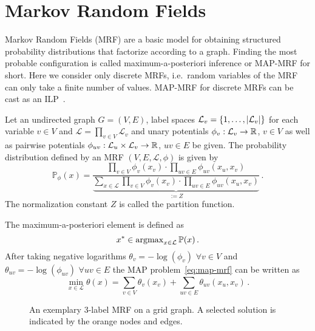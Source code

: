 \section{Markov Random Fields}
\label{sec:mrf}
Markov Random Fields (MRF) are a basic model for obtaining structured probability distributions that factorize according to a graph.
Finding the most probable configuration is called maximum-a-posteriori inference or MAP-MRF for short.
Here we consider only discrete MRFs, i.e.\ random variables of the MRF can only take a finite number of values.
MAP-MRF for discrete MRFs can be cast as an ILP~\cite{werner2007linear}.


\begin{definition}[MRF]
    \label{def:mrf}
Let an undirected graph $G=(V,E)$, label spaces $\mathcal{L}_v = \{1,\ldots, \lvert\mathcal{L}_v\rvert\}$ for each variable $v \in V$ and $\mathcal{L} = \prod_{v \in V} \mathcal{L}_v$ and 
unary potentials $\phi_v : \mathcal{L}_v \rightarrow \mathbb{R}$, $v \in V$ as well as pairwise potentials
$\phi_{uv} : \mathcal{L}_u \times \mathcal{L}_v \rightarrow \mathbb{R}$, $uv \in E$ be given.
The probability distribution defined by an MRF $(V,E,\mathcal{L},\phi)$ is given by
\begin{equation}
\mathbb{P}_{\phi}(x) = \frac{\prod_{v \in V} \phi_v(x_v) \cdot \prod_{uv \in E} \phi_{uv}(x_u,x_v)}{ \underbrace{\sum_{x \in \mathcal{L}} \prod_{v \in V} \phi_v(x_v) \cdot \prod_{uv \in E} \phi_{uv}(x_u,x_v)}_{ := Z } } \,.
\end{equation}
The normalization constant $Z$ is called the partition function.
\end{definition}

\begin{definition}[MAP]
The maximum-a-posteriori element is defined as
\begin{equation}
\label{eq:map-mrf}
x^* \in \operatorname{argmax}_{x \in \mathcal{L}} \mathbb{P}(x)\,.
\end{equation}
After taking negative logarithms $\theta_v = - \log(\phi_v)$ $\forall v \in V$ and $\theta_{uv} = -\log(\phi_{uv})$ $\forall uv \in E$ the MAP problem~\eqref{eq:map-mrf} can be written as
\begin{equation}
\min_{x \in \mathcal{L}} \theta(x) = \sum_{v \in V} \theta_v(x_v) + \sum_{uv \in E} \theta_{uv}(x_u,x_v) \,.
\end{equation}
\end{definition}

\begin{figure}[H]
    \centering
    
    \caption{
    An exemplary 3-label MRF on a grid graph.
    A selected solution is indicated by the orange nodes and edges.
    }
    \label{fig:mrf-illustration}
\end{figure}

